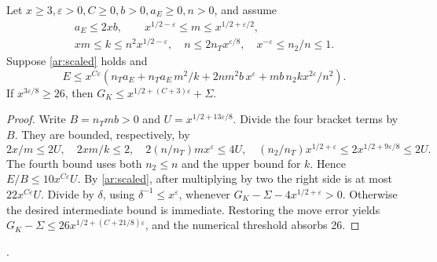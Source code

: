 \begin{proposition}\label{ar:four}
Let \(x\ge3,\varepsilon>0,C\ge0,b>0,a_E\ge0,n>0\), and assume
\[
 \begin{gathered}a_E\le2xb,\qquad x^{1/2-\varepsilon}\le m\le x^{1/2+\varepsilon/2},\\
 xm\le k\le n^2x^{1/2-\varepsilon},\quad
 n\le2n_Tx^{\varepsilon/8},\quad x^{-\varepsilon}\le n_2/n\le1 .\end{gathered}
\]
Suppose \eqref{ar:scaled} holds and
\[
 E\le x^{C\varepsilon}
 \left(n_Ta_E+n_Ta_E\,m^2/k+2nm^2b\,x^\varepsilon+
                         mb\,n_2 k x^{2\varepsilon}/n^2\right).
\]
If \(x^{3\varepsilon/8}\ge26\), then \(G_K\le x^{1/2+(C+3)\varepsilon}+\Sigma\).
\end{proposition}
\begin{proof}
Write \(B=n_Tmb>0\) and \(U=x^{1/2+13\varepsilon/8}\). Divide the four bracket terms by \(B\). They are bounded, respectively, by
\[
 2x/m\le2U,\quad 2xm/k\le2,\quad
 2(n/n_T)mx^\varepsilon\le4U,\quad
 (n_2/n_T)x^{1/2+\varepsilon}\le2x^{1/2+9\varepsilon/8}\le2U .
\]
The fourth bound uses both \(n_2\le n\) and the upper bound for \(k\). Hence \(E/B\le10x^{C\varepsilon}U\). By \eqref{ar:scaled}, after multiplying by two the right side is at most \(22x^{C\varepsilon}U\). Divide by \(\delta\), using \(\delta^{-1}\le x^\varepsilon\), whenever \(G_K-\Sigma-4x^{1/2+\varepsilon}>0\). Otherwise the desired intermediate bound is immediate. Restoring the move error yields \(G_K-\Sigma\le26x^{1/2+(C+21/8)\varepsilon}\), and the numerical threshold absorbs 26.
\end{proof}
\noindent
{}\quad
{}.

